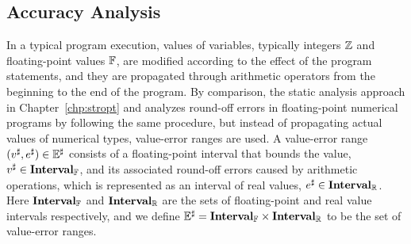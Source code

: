 \subsection{Accuracy Analysis}
\label{po:sub:accuracy_analysis}

In a typical program execution, values of variables, typically integers
$\mathbb{Z}$ and floating-point values $\mathbb{F}$, are modified according
to the effect of the program statements, and they are propagated through
arithmetic operators from the beginning to the end of the program.  By
comparison, the static analysis approach in Chapter~\ref{chp:stropt} and
\cite{martel07} analyzes round-off errors in floating-point numerical
programs by following the same procedure, but instead of propagating actual
values of numerical types, value-error ranges are used.  A value-error range
$(v^\sharp, e^\sharp) \in \mathbb{E}^\sharp$ consists of a floating-point interval that
bounds the value, $v^\sharp \in \mathbf{Interval}_\mathbb{F}$, and its associated
round-off errors caused by arithmetic operations, which is represented as
an interval of real values, $e^\sharp \in \mathbf{Interval}_\mathbb{R}$.  Here
$\mathbf{Interval}_\mathbb{F}$ and $\mathbf{Interval}_\mathbb{R}$ are the sets of
floating-point and real value intervals respectively, and we define $\mathbb{E}^\sharp
= \mathbf{Interval}_\mathbb{F} \times \mathbf{Interval}_\mathbb{R}$ to be the set of
value-error ranges.

